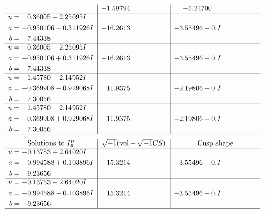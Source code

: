 \documentclass[1p]{elsarticle_modified}
\theoremstyle{definition}
\newcommand{\I}{\sqrt{-1}}
\begin{document}
$$\begin{array}{c|c|c}
 & -1.59794\phantom{ +0.000000I} & -5.24700\phantom{ +0.000000I} \\ \hline\begin{aligned}
u &= \phantom{-}0.36005 + 2.25095 I \\
a &= -0.950106 - 0.311926 I \\
b &= \phantom{-}7.44338\phantom{ +0.000000I}\end{aligned}
 & -16.2613\phantom{ +0.000000I} & -3.55496 + 0. I\phantom{ +0.000000I} \\ \hline\begin{aligned}
u &= \phantom{-}0.36005 - 2.25095 I \\
a &= -0.950106 + 0.311926 I \\
b &= \phantom{-}7.44338\phantom{ +0.000000I}\end{aligned}
 & -16.2613\phantom{ +0.000000I} & -3.55496 + 0. I\phantom{ +0.000000I} \\ \hline\begin{aligned}
u &= \phantom{-}1.45780 + 2.14952 I \\
a &= -0.369908 - 0.929068 I \\
b &= \phantom{-}7.30056\phantom{ +0.000000I}\end{aligned}
 & \phantom{-}11.9375\phantom{ +0.000000I} & -2.19806 + 0. I\phantom{ +0.000000I} \\ \hline\begin{aligned}
u &= \phantom{-}1.45780 - 2.14952 I \\
a &= -0.369908 + 0.929068 I \\
b &= \phantom{-}7.30056\phantom{ +0.000000I}\end{aligned}
 & \phantom{-}11.9375\phantom{ +0.000000I} & -2.19806 + 0. I\phantom{ +0.000000I}\\
 \hline 
 \end{array}$$\newpage$$\begin{array}{c|c|c}  
\text{Solutions to }I^u_{4}& \I (\text{vol} + \sqrt{-1}CS) & \text{Cusp shape}\\
 \hline 
\begin{aligned}
u &= -0.13753 + 2.64020 I \\
a &= -0.994588 + 0.103896 I \\
b &= \phantom{-}9.23656\phantom{ +0.000000I}\end{aligned}
 & \phantom{-}15.3214\phantom{ +0.000000I} & -3.55496 + 0. I\phantom{ +0.000000I} \\ \hline\begin{aligned}
u &= -0.13753 - 2.64020 I \\
a &= -0.994588 - 0.103896 I \\
b &= \phantom{-}9.23656\phantom{ +0.000000I}\end{aligned}
 & \phantom{-}15.3214\phantom{ +0.000000I} & -3.55496 + 0. I\phantom{ +0.000000I}\\
 \hline 
 \end{array}$$\newpage
\end{document}
